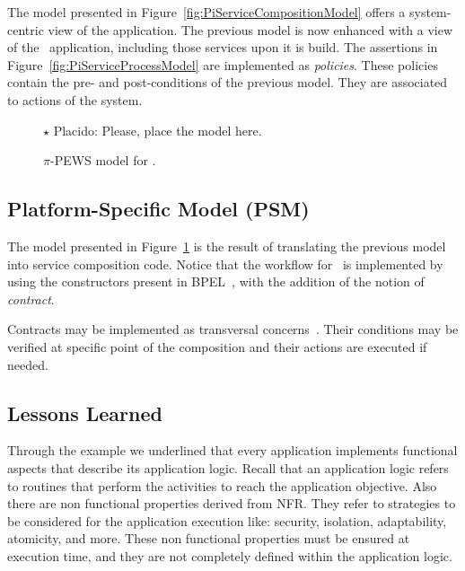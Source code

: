 The model presented in Figure~\ref{fig:PiServiceCompositionModel} offers a system-centric view of the application.
The previous model is now enhanced with a view of the \FlyingPig\ application, including those services upon  it is build.
The assertions in Figure~\ref{fig:PiServiceProcessModel} are implemented as \textit{policies}.
These policies contain the pre- and post-conditions of the previous model.
They are associated to actions of the system.


\begin{figure}[t]
\centering

{\color{red} \raggedright
$\star$ Placido: Please, place the model here.
}
\caption{$\pi$-PEWS model for \FlyingPig.\label{fig:PiPEWSModel}}
\end{figure}

\subsection{Platform-Specific Model (PSM)}

The model presented in Figure~\ref{fig:PiPEWSModel} is the result of translating the previous model into service composition code.
Notice that the workflow for \FlyingPig\ is implemented by using the constructors present in BPEL~\cite{BPEL}, with the addition of the notion of \textit{contract}.

Contracts may be implemented as transversal concerns~\cite{aspects}.
Their conditions may be verified at specific point of the composition and their actions are executed if needed.

\subsection{Lessons Learned}

Through the example we underlined that every application implements functional aspects that describe its application logic.
Recall that an application logic refers to routines that perform the activities to reach the application objective.
Also there are non functional properties derived from NFR. They refer to strategies to be considered for the application execution like: security, isolation, adaptability, atomicity, and more.
These non functional properties must be ensured at execution time, and they are not completely defined within the application logic.


